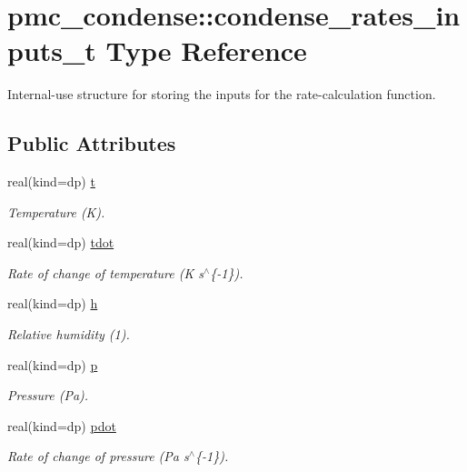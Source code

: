 \hypertarget{structpmc__condense_1_1condense__rates__inputs__t}{}\section{pmc\+\_\+condense\+:\+:condense\+\_\+rates\+\_\+inputs\+\_\+t Type Reference}
\label{structpmc__condense_1_1condense__rates__inputs__t}


Internal-\/use structure for storing the inputs for the rate-\/calculation function.  


\subsection*{Public Attributes}
\begin{DoxyCompactItemize}
\item 
real(kind=dp) \mbox{\hyperlink{structpmc__condense_1_1condense__rates__inputs__t_aadfd4801f15af0598e34062dfb8dead4}{t}}
\begin{DoxyCompactList}\small\item\em Temperature (K). \end{DoxyCompactList}\item 
real(kind=dp) \mbox{\hyperlink{structpmc__condense_1_1condense__rates__inputs__t_a365a712d305ec0848aa7152d7c53c4f5}{tdot}}
\begin{DoxyCompactList}\small\item\em Rate of change of temperature (K s$^\wedge$\{-\/1\}). \end{DoxyCompactList}\item 
real(kind=dp) \mbox{\hyperlink{structpmc__condense_1_1condense__rates__inputs__t_aa82900f8e93f684c01f592dbac8c8318}{h}}
\begin{DoxyCompactList}\small\item\em Relative humidity (1). \end{DoxyCompactList}\item 
real(kind=dp) \mbox{\hyperlink{structpmc__condense_1_1condense__rates__inputs__t_abf133217988163d44cd94a497c007cf6}{p}}
\begin{DoxyCompactList}\small\item\em Pressure (Pa). \end{DoxyCompactList}\item 
real(kind=dp) \mbox{\hyperlink{structpmc__condense_1_1condense__rates__inputs__t_a9f46dbdebf47cd7cb6679ce8b92887a3}{pdot}}
\begin{DoxyCompactList}\small\item\em Rate of change of pressure (Pa s$^\wedge$\{-\/1\}). \end{DoxyCompactList}\item 

\end{DoxyCompactItemize}
